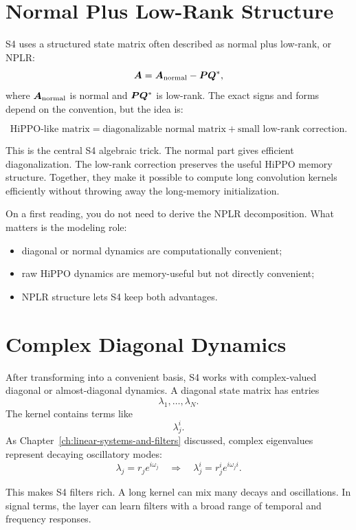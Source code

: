 \section{Normal Plus Low-Rank Structure}

S4 uses a structured state matrix often described as normal plus low-rank, or NPLR:
\[
  \bm{A} = \bm{A}_{\mathrm{normal}} - \bm{P}\bm{Q}^*,
\]
where $\bm{A}_{\mathrm{normal}}$ is normal and $\bm{P}\bm{Q}^*$ is low-rank. The exact signs and
forms depend on the convention, but the idea is:

\[
  \text{HiPPO-like matrix}
  =
  \text{diagonalizable normal matrix}
  +
  \text{small low-rank correction}.
\]

This is the central S4 algebraic trick. The normal part gives efficient diagonalization.
The low-rank correction preserves the useful HiPPO memory structure. Together, they make
it possible to compute long convolution kernels efficiently without throwing away the
long-memory initialization.

On a first reading, you do not need to derive the NPLR decomposition. What matters is the
modeling role:

\begin{itemize}
  \item diagonal or normal dynamics are computationally convenient;
  \item raw HiPPO dynamics are memory-useful but not directly convenient;
  \item NPLR structure lets S4 keep both advantages.
\end{itemize}

\section{Complex Diagonal Dynamics}

After transforming into a convenient basis, S4 works with complex-valued diagonal or
almost-diagonal dynamics. A diagonal state matrix has entries
\[
  \lambda_1,\ldots,\lambda_N.
\]
The kernel contains terms like
\[
  \lambda_j^i.
\]
As Chapter~\ref{ch:linear-systems-and-filters} discussed, complex eigenvalues represent
decaying oscillatory modes:
\[
  \lambda_j = r_j e^{i\omega_j}
  \quad \Rightarrow \quad
  \lambda_j^i = r_j^i e^{i\omega_j i}.
\]

This makes S4 filters rich. A long kernel can mix many decays and oscillations. In signal
terms, the layer can learn filters with a broad range of temporal and frequency responses.

